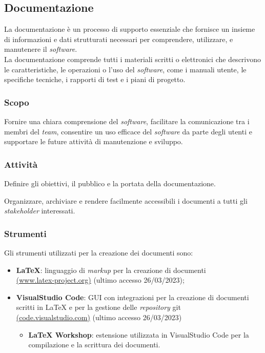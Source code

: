 \subsection{Documentazione}

La documentazione è un processo di supporto essenziale che fornisce un insieme
di informazioni e dati strutturati necessari per comprendere, utilizzare, e
manutenere il \textit{software}.\\
La documentazione comprende tutti i materiali scritti o elettronici che
descrivono le caratteristiche, le operazioni o l'uso del \textit{software},
come i manuali utente, le specifiche tecniche, i rapporti di test e i piani di
progetto.

\subsubsection{Scopo}
Fornire una chiara comprensione del \textit{software}, facilitare la
comunicazione tra i membri del \textit{team}, consentire un uso efficace del
\textit{software} da parte degli utenti e supportare le future attività di
manutenzione e sviluppo.

\subsubsection{Attività}
Definire gli obiettivi, il pubblico e la portata della documentazione.




Organizzare, archiviare e rendere facilmente accessibili i documenti a tutti gli
\textit{stakeholder} interessati.

\subsubsection{Strumenti}
Gli strumenti utilizzati per la creazione dei documenti sono:
\begin{itemize}
	\item \textbf{LaTeX}: linguaggio di \textit{markup} per la creazione di
	      documenti \\
	      \href{https://www.latex-project.org/}{(www.latex-project.org)} (ultimo accesso 26/03/2023);
	\item \textbf{VisualStudio Code}: GUI con integrazioni per la creazione di
	      documenti scritti in LaTeX e per la gestione delle \textit{repository\g} git\g \\
	      \href{https://code.visualstudio.com/}{(code.visualstudio.com)} (ultimo accesso 26/03/2023)
	      \begin{itemize}
		      \item \textbf{LaTeX Workshop}: estensione utilizzata in
		            VisualStudio Code per la compilazione e la scrittura dei
		            documenti.
	      \end{itemize}
\end{itemize}
